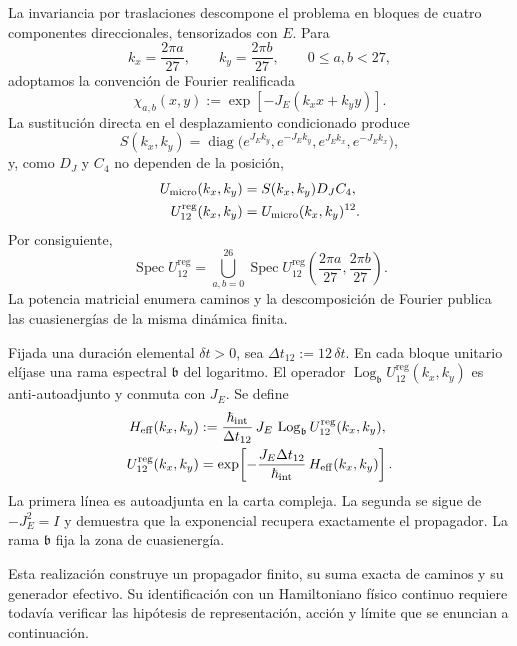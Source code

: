 La invariancia por traslaciones descompone el problema en bloques de cuatro
componentes direccionales, tensorizados con \(E\). Para
\[
 k_x=\frac{2\pi a}{27},
 \qquad
 k_y=\frac{2\pi b}{27},
 \qquad 0\leq a,b<27,
\]
adoptamos la convención de Fourier realificada
\[
 \chi_{a,b}(x,y)
 :=\exp[-J_E(k_xx+k_yy)].
\]
La sustitución directa en el desplazamiento condicionado produce
\[
 S(k_x,k_y)
 =\operatorname{diag}
 \bigl(
  e^{J_Ek_y},e^{-J_Ek_y},
  e^{J_Ek_x},e^{-J_Ek_x}
 \bigr),
\]
y, como \(D_J\) y \(C_4\) no dependen de la posición,
\begin{equation}
 \begin{aligned}
 U_{\rm micro}(k_x,k_y)
   &=S(k_x,k_y)D_JC_4,\\
 U_{12}^{\mathrm{reg}}(k_x,k_y)
   &=U_{\rm micro}(k_x,k_y)^{12}.
 \end{aligned}
 \label{eq:bloques-fourier-registro-27-rev3}
\end{equation}
Por consiguiente,
\[
 \operatorname{Spec}U_{12}^{\mathrm{reg}}
 =
 \bigcup_{a,b=0}^{26}
 \operatorname{Spec}
 U_{12}^{\mathrm{reg}}
 \left(\frac{2\pi a}{27},\frac{2\pi b}{27}\right).
\]
La potencia matricial enumera caminos y la descomposición de Fourier publica
las cuasienergías de la misma dinámica finita.

Fijada una duración elemental \(\delta t>0\), sea
\(\Delta t_{12}:=12\,\delta t\). En cada bloque unitario elíjase una rama
espectral \(\mathfrak b\) del logaritmo. El operador
\(\operatorname{Log}_{\mathfrak b}U_{12}^{\mathrm{reg}}(k_x,k_y)\) es
anti-autoadjunto y conmuta con \(J_E\). Se define
\begin{equation}
 \begin{aligned}
 H_{\rm eff}(k_x,k_y)
 &:=
 \frac{\hbar_{\rm int}}{\Delta t_{12}}\,
 J_E\,
 \operatorname{Log}_{\mathfrak b}
 U_{12}^{\mathrm{reg}}(k_x,k_y),\\
 U_{12}^{\mathrm{reg}}(k_x,k_y)
 &=
 \exp\!\left[
  -\frac{J_E\Delta t_{12}}{\hbar_{\rm int}}\,
  H_{\rm eff}(k_x,k_y)
 \right].
 \end{aligned}
 \label{eq:hamiltoniano-efectivo-registro-27-rev3}
\end{equation}
La primera línea es autoadjunta en la carta compleja. La segunda se sigue de
\(-J_E^2=I\) y demuestra que la exponencial recupera exactamente el
propagador. La rama \(\mathfrak b\) fija la zona de cuasienergía.

Esta realización construye un propagador finito, su suma exacta de caminos y
su generador efectivo. Su identificación con un Hamiltoniano físico continuo
requiere todavía verificar las hipótesis de representación, acción y límite
que se enuncian a continuación.


